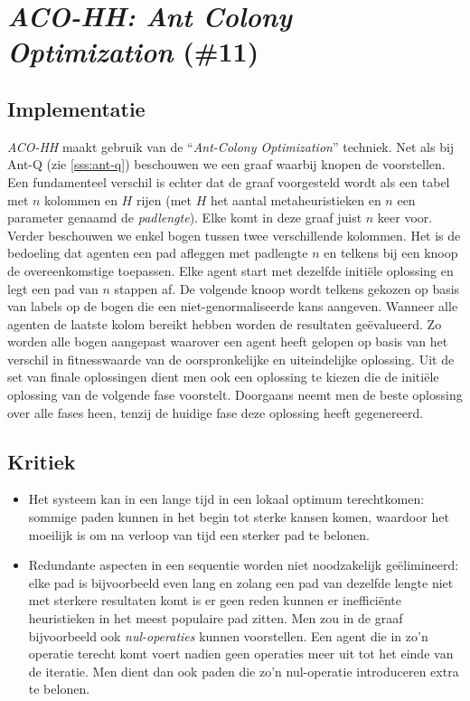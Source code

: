 \section{\emph{ACO-HH: Ant Colony Optimization} (\#11)}
\label{sss:aco-hh}
\subsection{Implementatie}
\emph{ACO-HH}\cite{chesc-aco-hh} maakt gebruik van de ``\emph{Ant-Colony Optimization}''\cite{hom/aco} techniek. Net als bij Ant-Q (zie \ref{sss:ant-q}) beschouwen we een graaf waarbij knopen de \abllhn{} voorstellen. Een fundamenteel verschil is echter dat de graaf voorgesteld wordt als een tabel met $n$ kolommen en $H$ rijen (met $H$ het aantal metaheuristieken en $n$ een parameter genaamd de \emph{padlengte}). Elke \abllh{} komt in deze graaf juist $n$ keer voor. Verder beschouwen we enkel bogen tussen twee verschillende kolommen. Het is de bedoeling dat agenten een pad afleggen met padlengte $n$ en telkens bij een knoop de overeenkomstige \abllh{} toepassen. Elke agent start met dezelfde initi\"ele oplossing en legt een pad van $n$ stappen af. De volgende knoop wordt telkens gekozen op basis van labels op de bogen die een niet-genormaliseerde kans aangeven. Wanneer alle agenten de laatste kolom bereikt hebben worden de resultaten ge\"evalueerd. Zo worden alle bogen aangepast waarover een agent heeft gelopen op basis van het verschil in fitnesswaarde van de oorspronkelijke en uiteindelijke oplossing. Uit de set van finale oplossingen dient men ook een oplossing te kiezen die de initi\"ele oplossing van de volgende fase voorstelt. Doorgaans neemt men de beste oplossing over alle fases heen, tenzij de huidige fase deze oplossing heeft gegenereerd.
\subsection{Kritiek}
\begin{itemize}
 \item Het systeem kan in een lange tijd in een lokaal optimum terechtkomen: sommige paden kunnen in het begin tot sterke kansen komen, waardoor het moeilijk is om na verloop van tijd een sterker pad te belonen.
 \item Redundante aspecten in een sequentie worden niet noodzakelijk ge\"elimineerd: elke pad is bijvoorbeeld even lang en zolang een pad van dezelfde lengte niet met sterkere resultaten komt is er geen reden kunnen er ineffici\"ente heuristieken in het meest populaire pad zitten. Men zou in de graaf bijvoorbeeld ook \emph{nul-operaties} kunnen voorstellen. Een agent die in zo'n operatie terecht komt voert nadien geen operaties meer uit tot het einde van de iteratie. Men dient dan ook paden die zo'n nul-operatie introduceren extra te belonen.
\end{itemize}